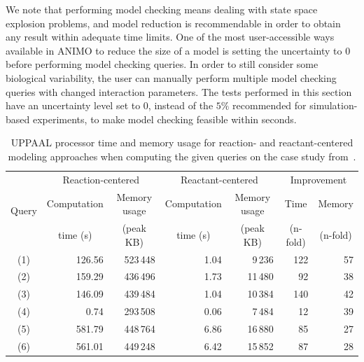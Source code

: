 \documentclass{llncs}
\begin{document}
We note that performing model checking means dealing with state space explosion problems,
and model reduction is recommendable in order to obtain any result within adequate time limits. One of the
most user-accessible ways available in ANIMO to reduce the size of a model is setting the uncertainty to 0
before performing model checking queries.
In order to still consider some biological variability, the user can manually perform multiple model checking queries with changed interaction parameters.
The tests performed in this section have an uncertainty level set to 0, instead of the $5\%$ recommended for simulation-based experiments, to
make model checking feasible within seconds.


\begin{table}[htbp]
  \begin{center}
    \begin{tabular}{|c||r|r||r|r||r|r|}
      \hline
       \multirow{3}{*}{Query} & \multicolumn{2}{c||}{Reaction-centered}	   & \multicolumn{2}{c||}{Reactant-centered} & \multicolumn{2}{c|}{Improvement}\\
      \cline{2-7}
       & \multicolumn{1}{c|}{Computation} & \multicolumn{1}{c||}{Memory usage} & \multicolumn{1}{c|}{Computation} & \multicolumn{1}{c||}{Memory usage} & \multicolumn{1}{c|}{Time} & \multicolumn{1}{c|}{Memory} \\
       & \multicolumn{1}{c|}{time (s)}    & \multicolumn{1}{c||}{(peak KB)}    & \multicolumn{1}{c|}{time (s)} & \multicolumn{1}{c||}{(peak KB)} & \multicolumn{1}{c|}{(n-fold)} & \multicolumn{1}{c|}{(n-fold)}\\
      \hline
      \hline
      (1) & 126.56 & 523\,{}448 & 1.04 & 9\,{}236 & 122 & 57 \\ %
      \hline
      (2) & 159.29 & 436\,{}496 & 1.73 & 11\,{}480 & 92 & 38 \\ %
      \hline
      (3) & 146.09 & 439\,{}484 & 1.04 & 10\,{}384 & 140 & 42 \\ %
      \hline
      (4) & 0.74 & 293\,{}508 & 0.06 & 7\,{}484 & 12 & 39 \\ %
      \hline
      (5) & 581.79 & 448\,{}764 & 6.86 & 16\,{}880 & 85 & 27 \\ %
      \hline
      (6) & 561.01 & 449\,{}248 & 6.42 & 15\,{}852 & 87 & 28 \\ %
      \hline
    \end{tabular}
  \end{center}
  \caption{UPPAAL processor time and memory usage for reaction- and reactant-centered modeling approaches when computing
  the given queries on the case study from~\cite{animo-ieee}.\label{tab:model-checking}}
\end{table}
\end{document}
